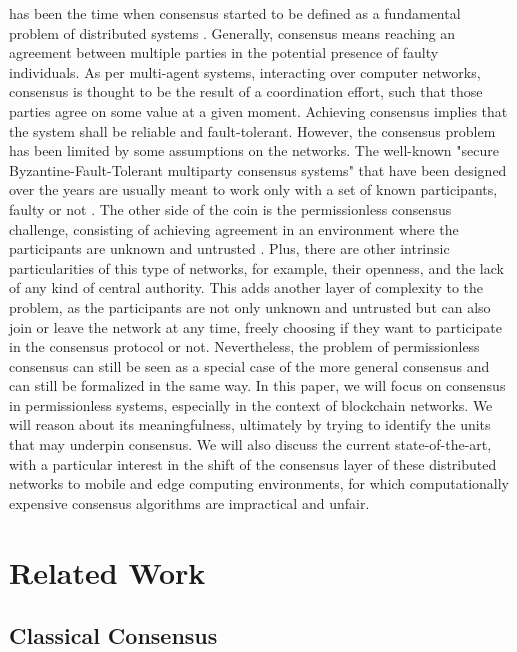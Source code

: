 \documentclass[journal]{IEEEtran}
\begin{document}
 has been the time when consensus started 
to be defined as a fundamental problem of distributed systems \cite{pease1980reaching, lamport2019byzantine, lamport1983weak}. 
Generally, consensus means reaching an agreement between multiple parties 
in the potential presence of faulty individuals. As per multi-agent systems, 
interacting over computer networks, consensus is thought to be the result 
of a coordination effort, such that those parties agree on some value at a 
given moment. Achieving consensus implies that the system shall be reliable 
and fault-tolerant. However, the consensus problem has been limited by some 
assumptions on the networks. The well-known "secure Byzantine-Fault-Tolerant 
multiparty consensus systems" that have been designed over the years are usually 
meant to work only with a set of known participants, faulty or not \cite{castro1999practical}. The 
other side of the coin is the permissionless consensus challenge, consisting of 
achieving agreement in an environment where the participants are unknown and 
untrusted \cite{nakamoto2008bitcoin, buterin2014next}. Plus, there are other intrinsic particularities of 
this type of networks, for example, their openness, and the lack of any kind of central 
authority. This adds another layer of complexity to the problem, as the participants 
are not only unknown and untrusted but can also join or leave the network at any time, 
freely choosing if they want to participate in the consensus protocol or not. Nevertheless, 
the problem of permissionless consensus can still be seen as a special case of the more 
general consensus and can still be formalized in the same way. In this paper, we will 
focus on consensus in permissionless systems, especially in the context of blockchain 
networks. We will reason about its meaningfulness, ultimately by trying to identify the units that 
may underpin consensus. We will also discuss the current state-of-the-art, with a 
particular interest in the shift of the consensus layer of these distributed networks 
to mobile and edge computing environments, for which computationally expensive consensus 
algorithms are impractical and unfair.

\section{Related Work}

\subsection{Classical Consensus}
\end{document}
